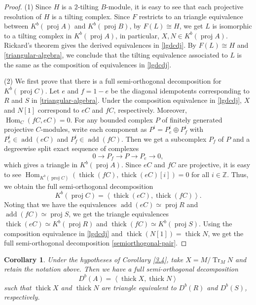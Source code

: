 \documentclass[reqno,12pt]{amsart}
\numberwithin{equation}{section}
\theoremstyle{plain}
\newtheorem{corollary}[theorem]{\bf Corollary}
\theoremstyle{definition}
\begin{document}
\begin{proof}
(1) Since $H$ is a $2$-tilting $B$-module, it is easy to see that each projective resolution of $H$
is a tilting complex.
Since $F$ restricts to an triangle equivalence between $K^b(\operatorname{proj}A)$ and $K^b(\operatorname{proj}B)$, by $F(L)\cong H$, we get $L$ is isomorphic to a tilting complex in
$K^b(\operatorname{proj}A)$, in particular, $X,N\in K^b(\operatorname{proj}A)$. Rickard's theorem \cite[Theorem 6.4]{RIC} gives the derived
equivalences in \eqref{lgdcdj}. By $F(L)\cong H$ and \eqref{triangular-algebra}, we conclude that the tilting equivalence associated to $L$ is the same as the composition of equivalences in \eqref{lgdcdj}.

(2) We first prove that there is a full semi-orthogonal decomposition for $K^b(\operatorname{proj}C)$. Let $e$ and $f=1-e$
be the diagonal idempotents corresponding to $R$ and $S$ in
\eqref{triangular-algebra}. Under the composition
equivalence in \eqref{lgdcdj}, $X$ and $N[1]$
correspond to $eC$ and $fC$, respectively. Moreover,
\(
\operatorname{Hom}_C(fC,eC)=0.
\)
For any bounded complex $P$ of finitely generated projective $C$-modules,
write each component as $P^i=P_e^i\oplus P_f^i$ with
$P_e^i\in\operatorname{add}(eC)$ and $P_f^i\in\operatorname{add}(fC)$.
Then we get a subcomplex $P_f$ of $P$  and  a
degreewise split exact sequence of complexes
\[
0\longrightarrow P_f\longrightarrow P\longrightarrow P_e
\longrightarrow0,
\]
which gives a triangle in $K^b(\operatorname{proj}A)$.  Since $eC$ and $fC$ are projective, it is easy to see
$\operatorname{Hom}_{K^b(\operatorname{proj}C)}
(\operatorname{thick}(fC),\operatorname{thick}(eC)[i])=0$ for all $i\in\mathbb{Z}$.
Thus, we obtain the full semi-orthogonal decomposition
\[
K^b(\operatorname{proj}C)
=\left\langle\operatorname{thick}(eC),\operatorname{thick}(fC)
\right\rangle.
\]
Noting that we have the equivalences
$\operatorname{add}(eC)\simeq\operatorname{proj}R$ and
$\operatorname{add}(fC)\simeq\operatorname{proj}S$, we get the triangle equivalences $\operatorname{thick}(eC)\simeq K^b(\operatorname{proj}R)$ and
$\operatorname{thick}(fC)\simeq K^b(\operatorname{proj}S)$. Using the composition
equivalence in \eqref{lgdcdj} and $\operatorname{thick}(N[1])=\operatorname{thick}N$, we get the full semi-orthogonal decomposition \eqref{semiorthogonal-pair}.
\end{proof}



\begin{corollary}\label{hereditary-triangular-application}
Under the hypotheses of Corollary \ref{3.4}, take
$X=M/\operatorname{Tr}_MN$ and retain the notation above. Then we have a full semi-orthogonal decomposition
\[
D^b(A)=\left\langle\operatorname{thick}X,
\operatorname{thick}N\right\rangle
\]
such that $\operatorname{thick}X$ and $\operatorname{thick}N$ are triangle equivalent to $D^b(R)$ and $D^b(S)$,
respectively.
\end{corollary}
\end{document}

